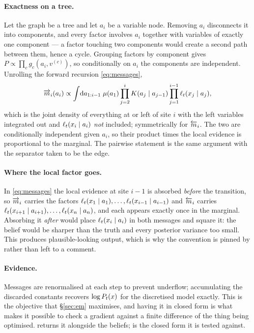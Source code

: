 \paragraph{Exactness on a tree.} Let the graph be a tree and let $a_i$ be a variable node.
Removing $a_i$ disconnects it into components, and every factor involves $a_i$ together with
variables of exactly one component --- a factor touching two components would create a second
path between them, hence a cycle. Grouping factors by component gives
$P \propto \prod_c g_c(a_i, v^{(c)})$, so conditionally on $a_i$ the components are independent.
Unrolling the forward recursion \eqref{eq:messages},
\[
\overrightarrow{m}_i(a_i) \propto \int\!\mathrm{d}a_{1:i-1}\;
\mu(a_1)\prod_{j=2}^{i}K(a_j\mid a_{j-1})\prod_{j=1}^{i-1}\ell_t(x_j\mid a_j),
\]
which is the joint density of everything at or left of site $i$ with the left variables
integrated out and $\ell_t(x_i\mid a_i)$ \emph{not} included; symmetrically for $\overleftarrow{m}_i$. The two
are conditionally independent given $a_i$, so their product times the local evidence is
proportional to the marginal. The pairwise statement is the same argument with the separator
taken to be the edge.

\paragraph{Where the local factor goes.} In \eqref{eq:messages} the local evidence at site $i-1$
is absorbed \emph{before} the transition, so $\overrightarrow{m}_i$ carries the factors
$\ell_t(x_1\mid a_1),\dots,\ell_t(x_{i-1}\mid a_{i-1})$ and $\overleftarrow{m}_i$ carries
$\ell_t(x_{i+1}\mid a_{i+1}),\dots,\ell_t(x_{n}\mid a_{n})$, and each appears exactly
once in the marginal. Absorbing it \emph{after} would place $\ell_t(x_i\mid a_i)$ in both
messages and square it: the
belief would be sharper than the truth and every posterior variance too small. This produces
plausible-looking output, which is why the convention is pinned by
 rather than left to a comment.

\paragraph{Evidence.} Messages are renormalised at each step to prevent underflow; accumulating
the discarded constants recovers $\log P_t(x)$ for the discretised model exactly. This is the
objective that \S\ref{sec:em} maximises, and having it in closed form is what makes it possible
to check a gradient against a finite difference of the thing being optimised.
 returns it alongside the beliefs;
 is the closed form it is tested against.

